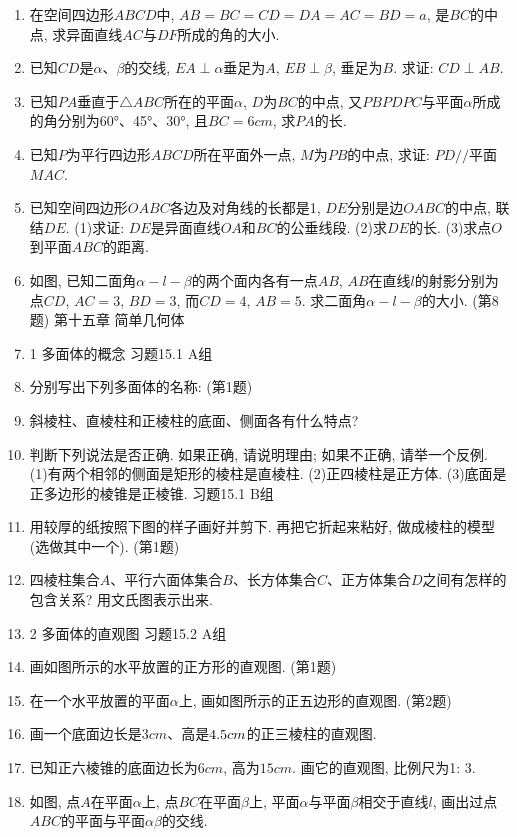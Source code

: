 \documentclass[10pt,a4paper]{article}
\newcommand{\blank}[1]{\underline{\hbox to #1pt{}}}
\begin{document}
\begin{enumerate}[1.]
(1)如果长方体的一条对角线与过同一个顶点的三个面所成的角分别是$\alpha \beta \gamma$那么$\sin ^2\alpha +\sin ^2\beta +\sin ^2\gamma \text=$\blank{50}.
(2)三个平面可将空间分成\blank{50}个部分.
\item 在空间四边形$ABCD$中, $AB=BC=CD=DA=AC=BD=a$, 是$BC$的中点, 求异面直线$AC$与$DF$所成的角的大小.
\item 已知$CD$是$\alpha$、$\beta$的交线, $EA\perp \alpha$垂足为$A$, $EB\perp \beta$, 垂足为$B$. 求证: $CD\perp AB$.
\item 已知$PA$垂直于$\triangle ABC$所在的平面$\alpha$, $D$为$BC$的中点, 又$PBPDPC$与平面$\alpha$所成的角分别为60°、45°、30°, 且$BC=6cm$, 求$PA$的长.
\item 已知$P$为平行四边形$ABCD$所在平面外一点, $M$为$PB$的中点, 求证: $PD//$平面$MAC$.
\item 已知空间四边形$OABC$各边及对角线的长都是1, $DE$分别是边$OABC$的中点, 联结$DE$.
(1)求证: $DE$是异面直线$OA$和$BC$的公垂线段.
(2)求$DE$的长.
(3)求点$O$到平面$ABC$的距离.
\item 如图, 已知二面角$\alpha -l-\beta$的两个面内各有一点$AB$, $AB$在直线$l$的射影分别为点$CD$, $AC=3$, $BD=3$, 而$CD=4$, $AB=5$. 求二面角$\alpha -l-\beta$的大小.
(第8题)
第十五章  简单几何体
\item 1  多面体的概念
习题15.1   A组
\item 分别写出下列多面体的名称:
(第1题)
\item 斜棱柱、直棱柱和正棱柱的底面、侧面各有什么特点?
\item 判断下列说法是否正确. 如果正确, 请说明理由; 如果不正确, 请举一个反例.
(1)有两个相邻的侧面是矩形的棱柱是直棱柱.
(2)正四棱柱是正方体.
(3)底面是正多边形的棱锥是正棱锥.
习题15.1 B组
\item 用较厚的纸按照下图的样子画好并剪下. 再把它折起来粘好, 做成棱柱的模型(选做其中一个).
(第1题)
\item 四棱柱集合$A$、平行六面体集合$B$、长方体集合$C$、正方体集合$D$之间有怎样的包含关系? 用文氏图表示出来.
\item 2  多面体的直观图
习题15.2  A组
\item 画如图所示的水平放置的正方形的直观图.
(第1题)
\item 在一个水平放置的平面$\alpha$上, 画如图所示的正五边形的直观图.
(第2题)
\item 画一个底面边长是$3cm$、高是$\text4.\text5cm$的正三棱柱的直观图.
\item 已知正六棱锥的底面边长为$6cm$, 高为$15cm$. 画它的直观图, 比例尺为1: 3.
\item 如图, 点$A$在平面$\alpha$上, 点$BC$在平面$\beta$上, 平面$\alpha$与平面$\beta$相交于直线$l$, 画出过点$ABC$的平面与平面$\alpha \beta$的交线.

\end{enumerate}
\end{document}
